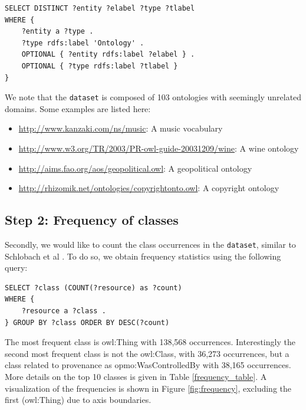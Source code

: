 \documentclass[runningheads,a4paper]{../../StyleFiles/llncs}
\begin{document}
\begin{lstlisting}[captionpos=b, caption=SPARQL query for getting different Ontologies in the \texttt{dataset}, label=lst:sparql, basicstyle=\ttfamily\small,frame=bt]
SELECT DISTINCT ?entity ?elabel ?type ?tlabel 
WHERE { 
	?entity a ?type .
	?type rdfs:label 'Ontology' .
	OPTIONAL { ?entity rdfs:label ?elabel } . 
	OPTIONAL { ?type rdfs:label ?tlabel } 
}
\end{lstlisting}
\label{ontology_query}

We note that the \texttt{dataset} is composed of 103 ontologies with seemingly unrelated domains. Some examples are listed here:

\begin{itemize}
	\item \url{http://www.kanzaki.com/ns/music}: A music vocabulary
	\item \url{http://www.w3.org/TR/2003/PR-owl-guide-20031209/wine}: A wine ontology
	\item \url{http://aims.fao.org/aos/geopolitical.owl}: A geopolitical ontology
	\item \url{ http://rhizomik.net/ontologies/copyrightonto.owl}: A copyright ontology
\end{itemize}

\subsection{Step 2: Frequency of classes}
Secondly, we would like to count the class occurrences in the \texttt{dataset}, similar to Schlobach et al \cite{schlobach2007anytime}. To do so, we obtain frequency statistics using the following query:

\begin{lstlisting}[captionpos=b, caption=SPARQL query for getting class frequencies, label=lst:sparql, basicstyle=\ttfamily\small,frame=bt]
SELECT ?class (COUNT(?resource) as ?count) 
WHERE {
	?resource a ?class . 
} GROUP BY ?class ORDER BY DESC(?count)
\end{lstlisting}

The most frequent class is owl:Thing with 138,568 occurrences. Interestingly the second most frequent class is not the owl:Class, with 36,273 occurrences, but a class related to provenance as opmo:WasControlledBy with 38,165 occurrences. More details on the top 10 classes is given in Table \ref{frequency_table}. A visualization of the frequencies is shown in Figure \ref{fig:frequency}, excluding the first (owl:Thing) due to axis boundaries.
\end{document}

